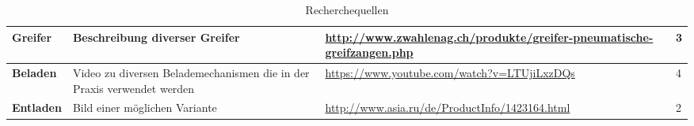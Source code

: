 \begin{table}[h]
\begin{tabular}{|p{3cm}|p{3.5cm}|p{5cm}|p{2cm}|}
\textbf{Greifer}	& 	Beschreibung diverser Greifer & \url{http://www.zwahlenag.ch/produkte/greifer-pneumatische-greifzangen.php} & 3 \\\hline	
\textbf{Beladen}	& 	Video zu diversen Belademechanismen die in der Praxis verwendet werden & \url{https://www.youtube.com/watch?v=LTUjiLxzDQs} & 4 \\\hline
\textbf{Entladen}	& 	Bild einer möglichen Variante & \url{http://www.asia.ru/de/ProductInfo/1423164.html} & 2 \\\hline	
\end{tabular}\\
\caption{Recherchequellen}
\end{table}